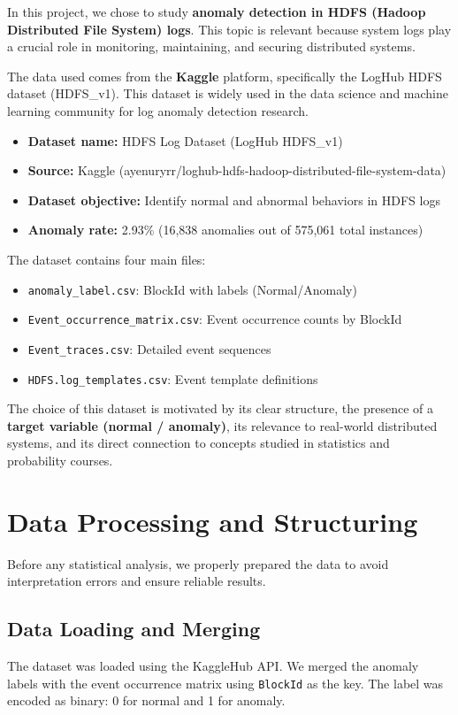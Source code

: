 \documentclass[12pt,a4paper]{article}
\theoremstyle{definition}
\theoremstyle{remark}
\begin{document}
In this project, we chose to study \textbf{anomaly detection in HDFS (Hadoop Distributed File System) logs}. This topic is relevant because system logs play a crucial role in monitoring, maintaining, and securing distributed systems.

The data used comes from the \textbf{Kaggle} platform, specifically the LogHub HDFS dataset (HDFS\_v1). This dataset is widely used in the data science and machine learning community for log anomaly detection research.

\begin{itemize}
    \item \textbf{Dataset name:} HDFS Log Dataset (LogHub HDFS\_v1)
    \item \textbf{Source:} Kaggle (ayenuryrr/loghub-hdfs-hadoop-distributed-file-system-data)
    \item \textbf{Dataset objective:} Identify normal and abnormal behaviors in HDFS logs
    \item \textbf{Anomaly rate:} 2.93\% (16,838 anomalies out of 575,061 total instances)
\end{itemize}

The dataset contains four main files:
\begin{itemize}
    \item \texttt{anomaly\_label.csv}: BlockId with labels (Normal/Anomaly)
    \item \texttt{Event\_occurrence\_matrix.csv}: Event occurrence counts by BlockId
    \item \texttt{Event\_traces.csv}: Detailed event sequences
    \item \texttt{HDFS.log\_templates.csv}: Event template definitions
\end{itemize}

The choice of this dataset is motivated by its clear structure, the presence of a \textbf{target variable (normal / anomaly)}, its relevance to real-world distributed systems, and its direct connection to concepts studied in statistics and probability courses.

\section{Data Processing and Structuring}

Before any statistical analysis, we properly prepared the data to avoid interpretation errors and ensure reliable results.

\subsection{Data Loading and Merging}
The dataset was loaded using the KaggleHub API. We merged the anomaly labels with the event occurrence matrix using \texttt{BlockId} as the key. The label was encoded as binary: 0 for normal and 1 for anomaly.
\end{document}
